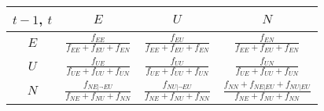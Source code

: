 \begin{tabular}{c|c|c|c}
  \hline \hline
  $t-1$, $t$ & $E$      & $U$      & $N$      \\ \hline
  $E$        & $\frac{f_{EE}}{f_{EE}+f_{EU}+f_{EN}}$
             & $\frac{f_{EU}}{f_{EE}+f_{EU}+f_{EN}}$
             & $\frac{f_{EN}}{f_{EE}+f_{EU}+f_{EN}}$
             \\ \hline
  $U$        & $\frac{f_{UE}}{f_{UE}+f_{UU}+f_{UN}}$
             & $\frac{f_{UU}}{f_{UE}+f_{UU}+f_{UN}}$
             & $\frac{f_{UN}}{f_{UE}+f_{UU}+f_{UN}}$
             \\ \hline
  $N$        & $\frac{f_{NE|\neg EU}}{f_{NE}+f_{NU}+f_{NN}}$
             & $\frac{f_{NU|\neg EU}}{f_{NE}+f_{NU}+f_{NN}}$
             & $\frac{f_{NN} + f_{NE|EU} + f_{NU|EU}}{f_{NE}+f_{NU}+f_{NN}}$
             \\ \hline \hline
\end{tabular}
